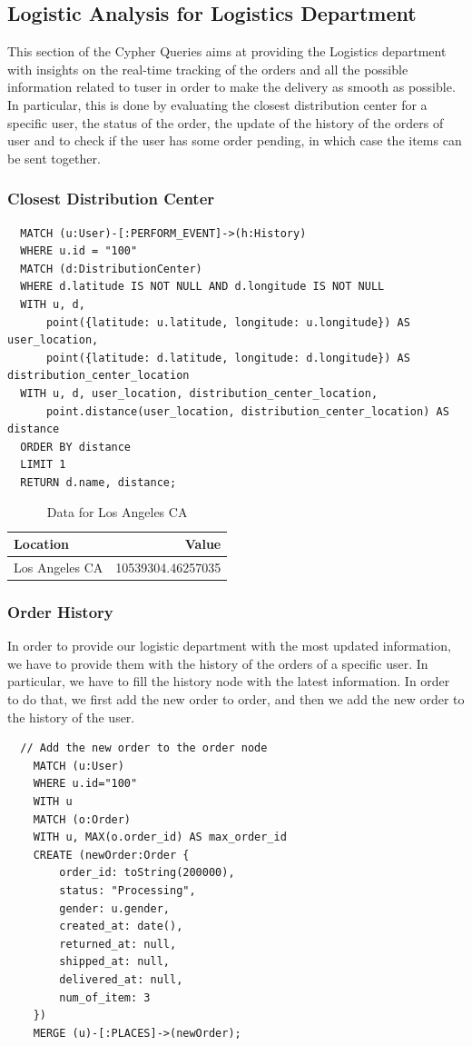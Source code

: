 \documentclass[a4paper,12pt]{article}
\begin{document}
\subsection{Logistic Analysis for Logistics Department}
This section of the Cypher Queries aims at providing the Logistics department with insights on the real-time tracking of the orders and all the possible information related to tuser in order to make the delivery as smooth as possible.
In particular, this is done by evaluating the closest distribution center for a specific user, the status of the order, the update of the history of the orders of user and to check if the user has some order pending, in which case the items can be sent together. 

\subsubsection{Closest Distribution Center}
\begin{verbatim}
  MATCH (u:User)-[:PERFORM_EVENT]->(h:History)
  WHERE u.id = "100"
  MATCH (d:DistributionCenter)
  WHERE d.latitude IS NOT NULL AND d.longitude IS NOT NULL
  WITH u, d, 
      point({latitude: u.latitude, longitude: u.longitude}) AS user_location, 
      point({latitude: d.latitude, longitude: d.longitude}) AS distribution_center_location
  WITH u, d, user_location, distribution_center_location, 
      point.distance(user_location, distribution_center_location) AS distance
  ORDER BY distance
  LIMIT 1
  RETURN d.name, distance;
\end{verbatim}

\begin{table}[h!]
  \centering
  \caption{Data for Los Angeles CA}
  \label{tab:los_angeles_data}
  \begin{tabular}{l r}
      \toprule
      \textbf{Location} & \textbf{Value} \\
      \midrule
      Los Angeles CA & 10539304.46257035 \\
      \bottomrule
  \end{tabular}
\end{table}

\subsubsection{Order History}
In order to provide our logistic department with the most updated information, we have to provide them with the history of the orders of a specific user.
In particular, we have to fill the history node with the latest information. In order to do that, we first add the new order to order, and then we add the new order to the history of the user.
\begin{verbatim}
  // Add the new order to the order node
    MATCH (u:User)
    WHERE u.id="100"
    WITH u
    MATCH (o:Order)
    WITH u, MAX(o.order_id) AS max_order_id
    CREATE (newOrder:Order { 
        order_id: toString(200000), 
        status: "Processing",
        gender: u.gender,
        created_at: date(),
        returned_at: null,
        shipped_at: null,
        delivered_at: null,
        num_of_item: 3
    })
    MERGE (u)-[:PLACES]->(newOrder);
\end{verbatim}
\end{document}

